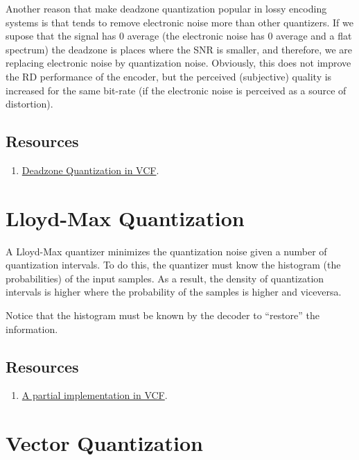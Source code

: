 Another reason that make deadzone quantization popular in lossy
encoding systems is that tends to remove electronic noise more than
other quantizers. If we supose that the signal has 0 average (the
electronic noise has 0 average and a flat spectrum) the deadzone is
places where the SNR is smaller, and therefore, we are replacing
electronic noise by quantization noise. Obviously, this does not
improve the RD performance of the encoder, but the perceived
(subjective) quality is increased for the same bit-rate (if the
electronic noise is perceived as a source of distortion).

\subsection*{Resources}
\begin{enumerate}
\item
  \href{https://github.com/Sistemas-Multimedia/VCF/blob/main/src/deadzone.py}{Deadzone
    Quantization in VCF}.
\end{enumerate}

\section{Lloyd-Max Quantization~\cite{vruiz__scalar_quantization}}

A Lloyd-Max quantizer minimizes the quantization noise given a number
of quantization intervals. To do this, the quantizer must know the
histogram (the probabilities) of the input samples. As a result, the
density of quantization intervals is higher where the probability of
the samples is higher and viceversa.

Notice that the histogram must be known by the decoder to ``restore''
the information.

\subsection*{Resources}

\begin{enumerate}
\item
  \href{https://github.com/Sistemas-Multimedia/VCF/blob/main/src/LloydMax.py}{A
    partial implementation in VCF}.
\end{enumerate}

\section{Vector Quantization~\cite{vruiz__vector_quantization}}

